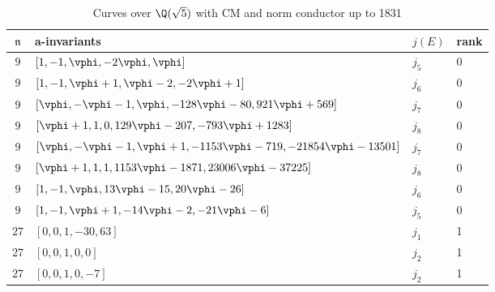 \documentclass{amsart}
\newcommand{\n}{\mathfrak{n}}
\begin{document}
\begin{center}
\begin{table}[h]
\caption{Curves over $\Q(\sqrt{5})$ with CM  and norm conductor up to 1831 \label{table:CM-curves}}
\begin{tabular}{|c|l|l|l|}\hline
{\bf $\n$} & {\bf a-invariants} & {\bf $j(E)$} &{\bf rank} \\\hline
 $9$ & $\left[1, -1, \vphi, -2\vphi, \vphi \right]$ & $j_5$ & 0 \\\hline %
 $9$ & $\left[1, -1, \vphi + 1, \vphi - 2, -2\vphi + 1\right]$ & $j_6$ & 0 \\\hline  %
$9$ & $\left[\vphi, -\vphi - 1, \vphi, -128\vphi - 80, 921\vphi + 569\right]$ & $j_7$ & 0 \\\hline %
$9$ & $\left[\vphi + 1, 1, 0, 129\vphi - 207, -793\vphi + 1283\right]$ & $j_8$ & 0\\\hline %
$9$ & $\left[\vphi, -\vphi - 1, \vphi + 1, -1153\vphi - 719, -21854\vphi - 13501\right]$ & $j_7$& 0 \\\hline %
$9$ & $\left[\vphi + 1, 1, 1, 1153\vphi - 1871, 23006\vphi - 37225\right]$ & $j_8$ & 0 \\\hline %
$9$ & $\left[1, -1, \vphi, 13\vphi - 15, 20\vphi - 26\right]$ & $j_6$& 0 \\\hline %
$9$ & $\left[1, -1, \vphi + 1, -14\vphi - 2, -21\vphi - 6\right]$ & $j_5$ & 0 \\\hline %
$27$ & $\left[0, 0, 1, -30, 63\right]$ & $j_1$ & 1 \\\hline %
 $27$ & $\left[0, 0, 1, 0, 0\right]$ & $j_2$ & 1 \\\hline %
$27$ & $\left[0, 0, 1, 0, -7\right]$ & $j_2$ & 1 \\\hline %

\end{tabular}
\end{table}
\end{center}
\end{document}
